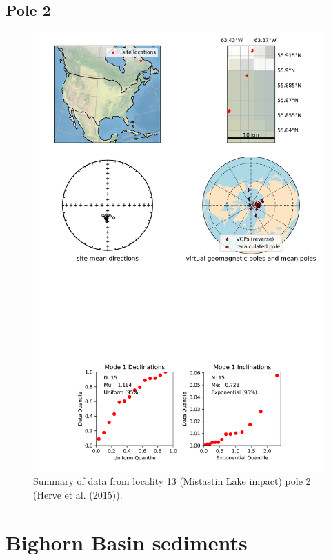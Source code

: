 \subsection{Pole 2}


\begin{figure}[H]
\centering
\includegraphics[width=5 in]{./13/2/pole_summary.png}
\caption{Summary of data from locality 13 (Mistastin Lake impact) pole 2 (Herve et al. (2015)).}
\end{figure}

\section{Bighorn Basin sediments}
